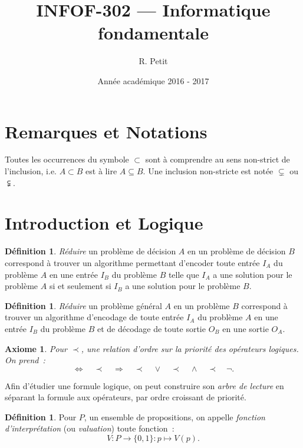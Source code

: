 \documentclass{article}
\title{INFOF-302 --- Informatique fondamentale}
\author{R. Petit}
\date{Année académique 2016 - 2017}
\newtheorem{axiome}[thm]{Axiome}
\theoremstyle{definition}
\newtheorem{déf}[thm]{Définition}
\theoremstyle{remark}
\begin{document}
\maketitle
\tableofcontents
\newpage
{}
\setcounter{page}{1}

\section*{Remarques et Notations}
	Toutes les occurrences du symbole $\subset$ sont à comprendre au sens non-strict de l'inclusion, i.e. $A \subset B$ est à lire $A \subseteq B$.
	Une inclusion non-stricte est notée $\subsetneq$ ou $\subsetneqq$.

\section{Introduction et Logique}
	\begin{déf} \textit{Réduire} un problème de décision $A$ en un problème de décision $B$ correspond à trouver un algorithme permettant d'encoder toute
	entrée $I_A$ du problème $A$ en une entrée $I_B$ du problème $B$ telle que $I_A$ a une solution pour le problème $A$ si et seulement si $I_B$
	a une solution pour le problème $B$.
	\end{déf}

	\begin{déf} \textit{Réduire} un problème général $A$ en un problème $B$ correspond à trouver un algorithme d'encodage de toute entrée $I_A$ du problème
	$A$ en une entrée $I_B$ du problème $B$ et de décodage de toute sortie $O_B$ en une sortie $O_A$.
	\end{déf}

	\begin{axiome} Pour $\prec$, une relation d'ordre sur la priorité des opérateurs logiques. On prend~:
	\[\Leftrightarrow \quad\prec\quad \Rightarrow \quad\prec\quad \lor \quad\prec\quad \land \quad\prec\quad \lnot.\]
	\end{axiome}

	Afin d'étudier une formule logique, on peut construire son \textit{arbre de lecture} en séparant la formule aux opérateurs, par ordre
	croissant de priorité.

	\begin{déf} Pour $P$, un ensemble de propositions, on appelle \textit{fonction d'interprétation} (ou \textit{valuation}) toute fonction~:
	\[V : P \to \{0, 1\} : p \mapsto V(p).\]
	\end{déf}
\end{document}
